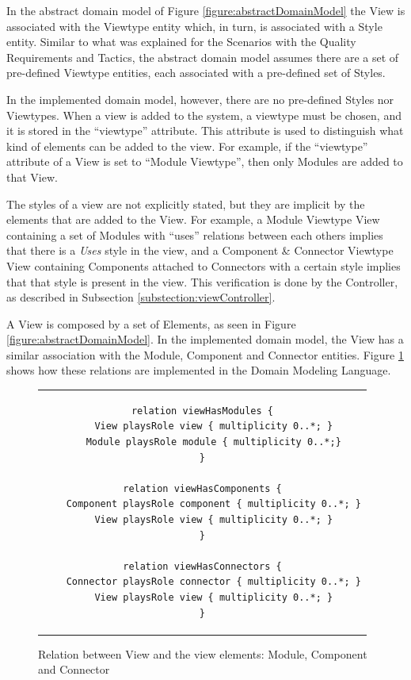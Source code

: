 In the abstract domain model of Figure \ref{figure:abstractDomainModel} the View is associated with the Viewtype entity which, in turn, is associated with a Style entity. Similar to what was explained for the Scenarios with the Quality Requirements and Tactics, the abstract domain model assumes there are a set of pre-defined Viewtype entities, each associated with a pre-defined set of Styles. 

In the implemented domain model, however, there are no pre-defined Styles nor Viewtypes. When a view is added to the system, a viewtype must be chosen, and it is stored in the ``viewtype'' attribute. This attribute is used to distinguish what kind of elements can be added to the view. For example, if the ``viewtype'' attribute of a View is set to ``Module Viewtype'', then only Modules are added to that View. 

The styles of a view are not explicitly stated, but they are implicit by the elements that are added to the View. For example, a Module Viewtype View containing a set of Modules with ``uses'' relations between each others implies that there is a \textit{Uses} style in the view, and a Component \& Connector Viewtype View containing Components attached to Connectors with a certain style implies that that style is present in the view. This verification is done by the Controller, as described in Subsection \ref{substection:viewController}.

A View is composed by a set of Elements, as seen in Figure \ref{figure:abstractDomainModel}. In the implemented domain model, the View has a similar association with the Module, Component and Connector entities. Figure \ref{figure:modelviewelements} shows how these relations are implemented in the Domain Modeling Language.

\begin{figure}[h]
\centering
\lstset{style=customjava}
\begin{tabular}{c}
\begin{lstlisting}
relation viewHasModules {
	View playsRole view { multiplicity 0..*; }
	Module playsRole module { multiplicity 0..*;}
}

relation viewHasComponents {
	Component playsRole component { multiplicity 0..*; }
	View playsRole view { multiplicity 0..*; }
}

relation viewHasConnectors {
	Connector playsRole connector { multiplicity 0..*; }
	View playsRole view { multiplicity 0..*; }
}
\end{lstlisting}
\end{tabular}
\caption{Relation between View and the view elements: Module, Component and Connector}
\label{figure:modelviewelements}
\end{figure}

